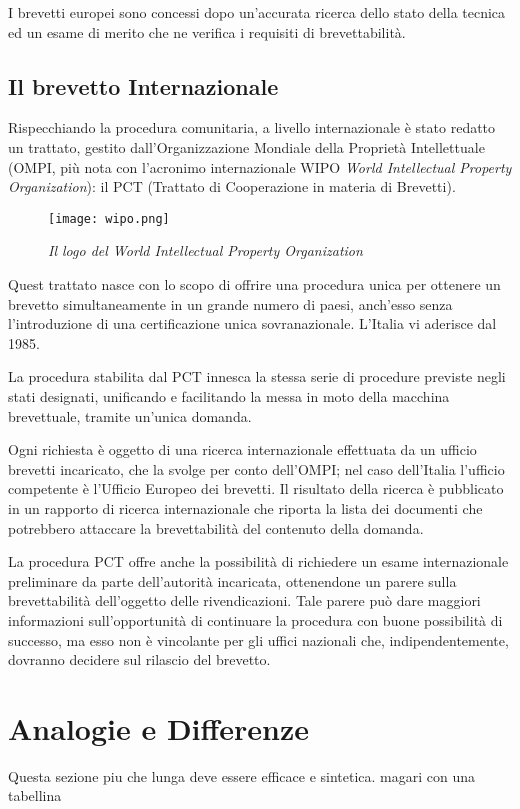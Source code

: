I brevetti europei sono concessi dopo un'accurata ricerca dello stato della tecnica ed un esame di merito che ne verifica i requisiti di brevettabilità.
\subsection{Il brevetto Internazionale}
Rispecchiando la procedura comunitaria, a livello internazionale è stato redatto un trattato, gestito dall'Organizzazione Mondiale della Proprietà Intellettuale (OMPI, più nota con l'acronimo internazionale WIPO \textit{World Intellectual Property Organization}): il PCT (Trattato di Cooperazione in materia di Brevetti).
\begin{figure}[hb]
\centering
	\texttt{[image: wipo.png]}
\caption{\textit{Il logo del World Intellectual Property Organization}}
\end{figure}
Quest trattato nasce con lo scopo di offrire una procedura unica per ottenere un brevetto simultaneamente in un grande numero di paesi, anch'esso senza l'introduzione di una certificazione unica sovranazionale. L'Italia vi aderisce dal 1985.

La procedura stabilita dal PCT innesca la stessa serie di procedure previste negli stati designati, unificando e facilitando la messa in moto della macchina brevettuale, tramite un'unica domanda.

Ogni richiesta è oggetto di una ricerca internazionale effettuata da un ufficio brevetti incaricato, che la svolge per conto dell'OMPI; nel caso dell'Italia l'ufficio competente è l'Ufficio Europeo dei brevetti. Il risultato della ricerca è pubblicato in un rapporto di ricerca internazionale che riporta la lista dei documenti che potrebbero attaccare la brevettabilità del contenuto della domanda.

La procedura PCT offre anche la possibilità di richiedere un esame internazionale preliminare da parte dell'autorità incaricata, ottenendone un parere sulla brevettabilità dell'oggetto delle rivendicazioni. Tale parere può dare maggiori informazioni sull'opportunità di continuare la procedura con buone possibilità di successo, ma esso non è vincolante per gli uffici nazionali che, indipendentemente, dovranno decidere sul rilascio del brevetto.

\section{Analogie e Differenze}\label{sec:analogDiffBrevetti}
Questa sezione piu che lunga deve essere efficace e sintetica. magari con una tabellina
